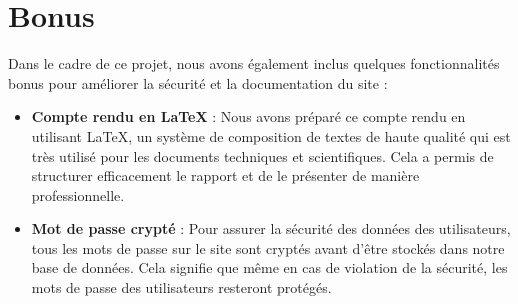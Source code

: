 \documentclass{article}
\begin{document}
\section{Bonus}

Dans le cadre de ce projet, nous avons également inclus quelques fonctionnalités bonus pour améliorer la sécurité et la documentation du site :

\begin{itemize}
\item \textbf{Compte rendu en LaTeX} : Nous avons préparé ce compte rendu en utilisant LaTeX, un système de composition de textes de haute qualité qui est très utilisé pour les documents techniques et scientifiques. Cela a permis de structurer efficacement le rapport et de le présenter de manière professionnelle.

\item \textbf{Mot de passe crypté} : Pour assurer la sécurité des données des utilisateurs, tous les mots de passe sur le site sont cryptés avant d'être stockés dans notre base de données. Cela signifie que même en cas de violation de la sécurité, les mots de passe des utilisateurs resteront protégés.
\end{itemize}
\end{document}
